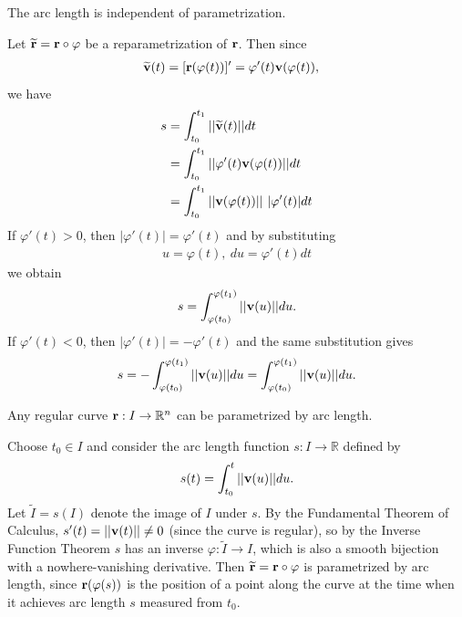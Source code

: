 \documentclass[12pt,letterpaper,reqno]{article}
\numberwithin{equation}{section}
\newcommand{\R}{\ensuremath{\mathbb R}}
\newcommand{\bv}{{\bf v}}
\newcommand{\bbr}{{\bf r}}
\begin{document}
{\begin{prop}
	The arc length is independent of parametrization.
\end{prop}

\begin{pf}
Let $\widetilde{\bbr}=\bbr \circ \varphi$ be a reparametrization of $\bbr$. Then since
\begin{align*}
\widetilde{\bv}(t)&=[\bbr(\varphi(t))]'=\varphi'(t)\bv(\varphi(t)),
\end{align*}
we have
\begin{align*}
	s&=\int_{t_0}^{t_1}||\widetilde{\bv}(t)||dt \\
	&=\int_{t_0}^{t_1}||\varphi'(t)\bv(\varphi(t))||dt \\
	&=\int_{t_0}^{t_1}||\bv(\varphi(t))|| \ |\varphi'(t)|dt \\
\end{align*}	
If $\varphi'(t)>0$, then $|\varphi'(t)|=\varphi'(t)$ and by substituting
\begin{align*}
	u=\varphi(t), \ du=\varphi'(t)dt
\end{align*}
we obtain
\begin{align*}
	s=\int_{\varphi(t_0)}^{\varphi(t_1)}||\bv(u)||du.
\end{align*}
If $\varphi'(t)<0$, then $|\varphi'(t)|=-\varphi'(t)$ and the same substitution gives
\begin{align*}
	s=-\int_{\varphi(t_0)}^{\varphi(t_1)}||\bv(u)||du=\int_{\varphi(t_0)}^{\varphi(t_1)}||\bv(u)||du.
\end{align*}
\end{pf}

\begin{prop}
	Any regular curve $\bbr:I \to \R^n$ can be parametrized by arc length.
\end{prop}

\begin{pf}
Choose $t_0 \in I$ and consider the arc length function $s:I \to \R$ defined by
\begin{align*}
	s(t)=\int_{t_0}^t||\bv(u)||du. 
\end{align*}	
Let $\tilde{I}=s(I)$ denote the image of $I$ under $s$. By the Fundamental Theorem of Calculus, $s'(t)=||\bv(t)|| \neq 0$ (since the curve is regular), so by the Inverse Function Theorem $s$ has an inverse $\varphi:\tilde{I} \to I$, which is also a smooth bijection with a nowhere-vanishing derivative. Then $\widetilde{\bbr}=\bbr \circ \varphi$ is parametrized by arc length, since $\bbr(\varphi(s))$ is the position of a point along the curve at the time when it achieves arc length $s$ measured from $t_0$.
\end{pf}

}
\end{document}
